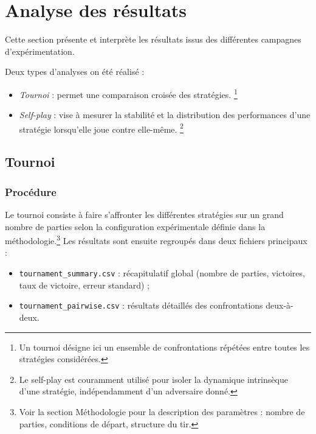 \section{Analyse des résultats}

Cette section présente et interprète les résultats issus des différentes campagnes d’expérimentation.  

Deux types d’analyses on été réalisé :
\begin{itemize}
    \item \emph{Tournoi} : permet une comparaison croisée des stratégies. \footnote{Un tournoi désigne ici un ensemble de confrontations répétées entre toutes les stratégies considérées.}
    \item \emph{Self-play} : vise à mesurer la stabilité et la distribution des performances d’une stratégie lorsqu’elle joue contre elle-même. \footnote{Le self-play est couramment utilisé pour isoler la dynamique intrinsèque d’une stratégie, indépendamment d’un adversaire donné.}
\end{itemize}

\subsection{Tournoi}

\subsubsection{Procédure}

Le tournoi consiste à faire s’affronter les différentes stratégies sur un grand nombre de parties selon la configuration expérimentale définie dans la méthodologie.\footnote{Voir la section Méthodologie pour la description des paramètres : nombre de parties, conditions de départ, structure du tir.}  
Les résultats sont ensuite regroupés dans deux fichiers principaux :

\begin{itemize}
    \item \texttt{tournament\_summary.csv} : récapitulatif global (nombre de parties, victoires, taux de victoire, erreur standard) ;
    \item \texttt{tournament\_pairwise.csv} : résultats détaillés des confrontations deux-à-deux.
\end{itemize}

